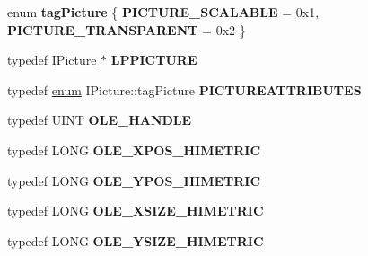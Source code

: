 \begin{DoxyCompactItemize}
\item 
\mbox{\label{interface_i_picture_a3e767470bde41803d363f36c8233e776}} 
enum {\bfseries tag\+Picture} \{ {\bfseries P\+I\+C\+T\+U\+R\+E\+\_\+\+S\+C\+A\+L\+A\+B\+LE} = 0x1, 
{\bfseries P\+I\+C\+T\+U\+R\+E\+\_\+\+T\+R\+A\+N\+S\+P\+A\+R\+E\+NT} = 0x2
 \}
\item 
\mbox{\label{interface_i_picture_adada52ea090f8db635ef3ff5a74c6374}} 
typedef \hyperlink{interface_i_picture}{I\+Picture} $\ast$ {\bfseries L\+P\+P\+I\+C\+T\+U\+RE}
\item 
\mbox{\label{interface_i_picture_a2dd7c8b16e8fb9ff6940b037f852b3ff}} 
typedef \hyperlink{interfaceenum}{enum} I\+Picture\+::tag\+Picture {\bfseries P\+I\+C\+T\+U\+R\+E\+A\+T\+T\+R\+I\+B\+U\+T\+ES}
\item 
\mbox{\label{interface_i_picture_a4a0493d32ac9305973a79a4f83fde5e6}} 
typedef U\+I\+NT {\bfseries O\+L\+E\+\_\+\+H\+A\+N\+D\+LE}
\item 
\mbox{\label{interface_i_picture_a2fdd00b0abcf7c682bc3464c68577ec3}} 
typedef L\+O\+NG {\bfseries O\+L\+E\+\_\+\+X\+P\+O\+S\+\_\+\+H\+I\+M\+E\+T\+R\+IC}
\item 
\mbox{\label{interface_i_picture_a05dee8cab9a78d689ce999450c1d4720}} 
typedef L\+O\+NG {\bfseries O\+L\+E\+\_\+\+Y\+P\+O\+S\+\_\+\+H\+I\+M\+E\+T\+R\+IC}
\item 
\mbox{\label{interface_i_picture_a7c1152f0da237806a80e58399d6b97f2}} 
typedef L\+O\+NG {\bfseries O\+L\+E\+\_\+\+X\+S\+I\+Z\+E\+\_\+\+H\+I\+M\+E\+T\+R\+IC}
\item 
\mbox{\label{interface_i_picture_adb433a5d310ea3064ed5c67cde23bb18}} 
typedef L\+O\+NG {\bfseries O\+L\+E\+\_\+\+Y\+S\+I\+Z\+E\+\_\+\+H\+I\+M\+E\+T\+R\+IC}
\end{DoxyCompactItemize}
